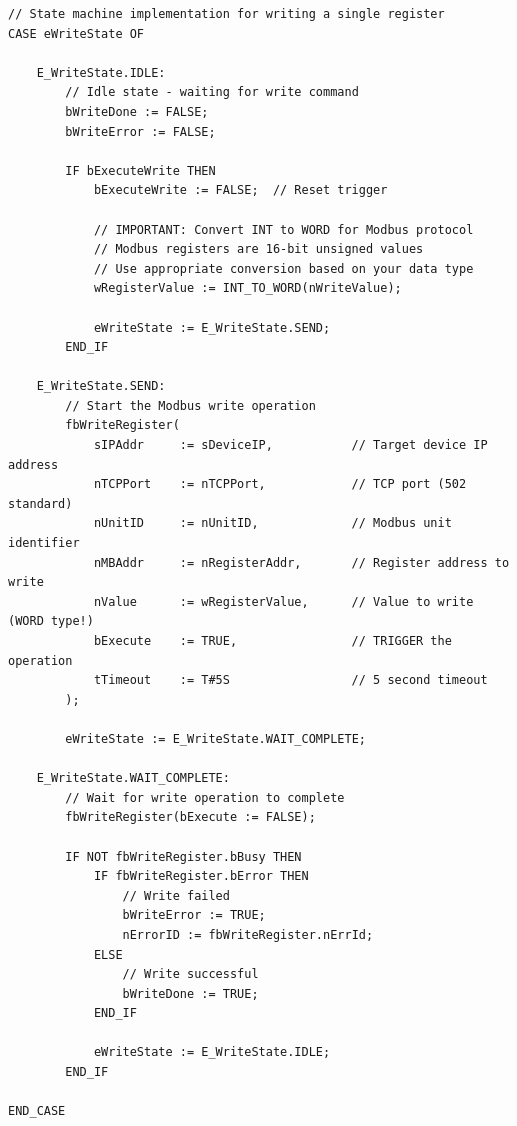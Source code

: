 \documentclass[11pt,a4paper]{article}
\begin{document}
\begin{lstlisting}
// State machine implementation for writing a single register
CASE eWriteState OF

    E_WriteState.IDLE:
        // Idle state - waiting for write command
        bWriteDone := FALSE;
        bWriteError := FALSE;
        
        IF bExecuteWrite THEN
            bExecuteWrite := FALSE;  // Reset trigger
            
            // IMPORTANT: Convert INT to WORD for Modbus protocol
            // Modbus registers are 16-bit unsigned values
            // Use appropriate conversion based on your data type
            wRegisterValue := INT_TO_WORD(nWriteValue);
            
            eWriteState := E_WriteState.SEND;
        END_IF
        
    E_WriteState.SEND:
        // Start the Modbus write operation
        fbWriteRegister(
            sIPAddr     := sDeviceIP,           // Target device IP address
            nTCPPort    := nTCPPort,            // TCP port (502 standard)
            nUnitID     := nUnitID,             // Modbus unit identifier
            nMBAddr     := nRegisterAddr,       // Register address to write
            nValue      := wRegisterValue,      // Value to write (WORD type!)
            bExecute    := TRUE,                // TRIGGER the operation
            tTimeout    := T#5S                 // 5 second timeout
        );
        
        eWriteState := E_WriteState.WAIT_COMPLETE;
        
    E_WriteState.WAIT_COMPLETE:
        // Wait for write operation to complete
        fbWriteRegister(bExecute := FALSE);
        
        IF NOT fbWriteRegister.bBusy THEN
            IF fbWriteRegister.bError THEN
                // Write failed
                bWriteError := TRUE;
                nErrorID := fbWriteRegister.nErrId;
            ELSE
                // Write successful
                bWriteDone := TRUE;
            END_IF
            
            eWriteState := E_WriteState.IDLE;
        END_IF

END_CASE
\end{lstlisting}
\end{document}
